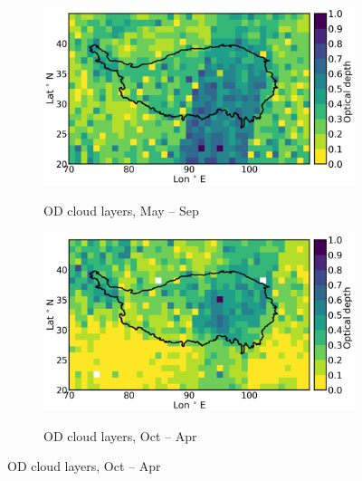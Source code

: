 \documentclass[alpha-refs]{wiley-article}
\begin{document}
\begin{figure}[!htbp]
        \begin{subfigure}[b]{0.5\textwidth}
       \centering
        \caption{OD cloud layers, May -- Sep }       
        \includegraphics[width=\textwidth]{2C-ICE_OD_cld_occ_monsoon.png}
        \label{fig:od3}
    \end{subfigure}%
    \begin{subfigure}[b]{0.5\textwidth}
        \centering
        \caption{OD cloud layers, Oct -- Apr} 
        \includegraphics[width=\textwidth]{2C-ICE_OD_cld_occ_westerly.png}
         \label{fig:od4}
    \end{subfigure}   
    


\end{figure}
\end{document}
